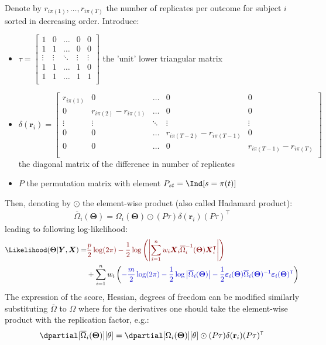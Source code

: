 \documentclass[12pt]{article}
\newcommand{\darkblue}{blue!80!black}
\newcommand{\darkred}{red!50!black}
\newcommand\trans[1]{{#1}^\intercal}%
\newcommand{\param}{\Theta}
\newcommand{\Vparam}{\boldsymbol{\param}}
\newcommand{\VX}{\boldsymbol{X}}
\newcommand{\VY}{\boldsymbol{Y}}
\newcommand{\Vvarepsilon}{\boldsymbol{\varepsilon}}
\begin{document}
Denote by \(r_{i\pi(1)},\ldots,r_{i\pi(T)}\) the number of replicates
per outcome for subject \(i\) sorted in decreasing order. Introduce:
\begin{itemize}
\item \(\tau=\begin{bmatrix}1 & 0 & \ldots & 0 & 0 \\ 1 & 1 & \ldots & 0 &
  0 \\ \vdots & \vdots & \ddots & \vdots & \vdots \\ 1 & 1 & \ldots &
  1 & 0 \\ 1 & 1 & \ldots & 1 & 1 \\ \end{bmatrix}\) the 'unit' lower
triangular matrix
\item \(\delta(\mathbf{r}_i)=\begin{bmatrix}r_{i\pi(1)} & 0 & \ldots & 0 &
  0 \\ 0 & r_{i\pi(2)} - r_{i\pi(1)} & \ldots & 0 & 0 \\ \vdots &
  \vdots & \ddots & \vdots & \vdots \\ 0 & 0 & \ldots &
  r_{i\pi(T-2)} - r_{i\pi(T-1)} & 0 \\ 0 & 0 & \ldots & 0 &
  r_{i\pi(T-1)} - r_{i\pi(T)} \\ \end{bmatrix}\) the diagonal matrix
of the difference in number of replicates
\item \(P\) the permutation matrix with element \(P_{st}=\Ind[s=\pi(t)]\)
\end{itemize}
Then, denoting by \(\odot\) the element-wise product (also called Hadamard product):  
\begin{align*}
\overline{\Omega}_{i}(\Vparam) = \Omega_i(\Vparam) \odot (P \tau)  \delta(\mathbf{r}_i) \trans{(P \tau)}
\end{align*}
leading to following log-likelihood:
\begin{align*}
\Likelihood(\Vparam|\VY,\VX) =& \textcolor{\darkred}{ \frac{p}{2} \log(2\pi)-\frac{1}{2} \log\left(\left|\sum_{i=1}^n w_i \VX_i \overline{\Omega}_i^{-1}(\Vparam) \trans{\VX}_i\right|\right)} \notag \\
& + \sum_{i=1}^{n} w_i \left(\textcolor{\darkblue}{-\frac{m}{2} \log(2\pi) - \frac{1}{2} \log\left|\overline{\Omega}_i(\Vparam)\right| - \frac{1}{2} \Vvarepsilon_i(\Vparam) \overline{\Omega}_i(\Vparam)^{-1} \trans{\Vvarepsilon_i(\Vparam)}} \right) 
\end{align*}
The expression of the score, Hessian, degrees of freedom can be
modified similarly substituting \(\overline{\Omega}\) to \(\Omega\)
where for the derivatives one should take the element-wise product with
the replication factor, e.g.:
\begin{align*}
\dpartial[\overline{\Omega}_{i}(\Vparam)][\theta] = \dpartial[\Omega_{i}(\Vparam)][\theta] \odot (P \tau)  \delta(\mathbf{r}_i) \trans{(P \tau)}
\end{align*}
\end{document}
